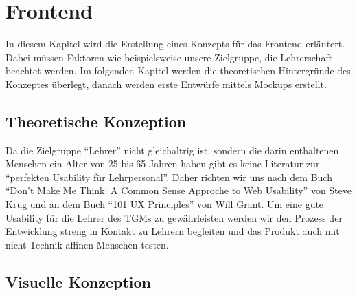 \section{Frontend}
In diesem Kapitel wird die Erstellung eines Konzepts für das Frontend erläutert. Dabei müssen Faktoren wie beispielsweise unsere Zielgruppe, die Lehrerschaft beachtet werden. Im folgenden Kapitel werden die theoretischen Hintergründe des Konzeptes überlegt, danach werden erste Entwürfe mittels Mockups erstellt. 
\subsection{Theoretische Konzeption}
Da die Zielgruppe \enquote{Lehrer} nicht gleichaltrig ist, sondern die darin enthaltenen Menschen ein Alter von 25 bis 65 Jahren haben gibt es keine Literatur zur \enquote{perfekten Usability für Lehrpersonal}. Daher richten wir uns nach dem Buch \enquote{Don't Make Me Think: A Common Sense Approche to Web Usability} von Steve Krug und an dem Buch \enquote{101 UX Principles} von Will Grant. Um eine gute Usability für die Lehrer des TGMs zu gewährleisten werden wir den Prozess der Entwicklung streng in Kontakt zu Lehrern begleiten und das Produkt auch mit nicht Technik affinen Menschen testen.  
\newpage
\subsection{Visuelle Konzeption}
